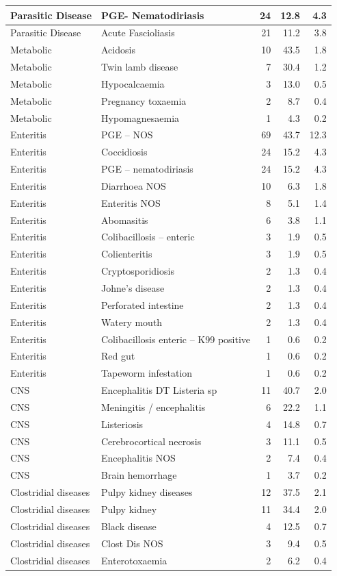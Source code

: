 \documentclass[]{book}
\begin{document}
\begin{table}
\begin{tabular}[t]{l|l|r|r|r}
\hline
Parasitic Disease & PGE- Nematodiriasis & 24 & 12.8 & 4.3\\
\hline
Parasitic Disease & Acute Fascioliasis & 21 & 11.2 & 3.8\\
\hline
Metabolic & Acidosis & 10 & 43.5 & 1.8\\
\hline
Metabolic & Twin lamb disease & 7 & 30.4 & 1.2\\
\hline
Metabolic & Hypocalcaemia & 3 & 13.0 & 0.5\\
\hline
Metabolic & Pregnancy toxaemia & 2 & 8.7 & 0.4\\
\hline
Metabolic & Hypomagnesaemia & 1 & 4.3 & 0.2\\
\hline
Enteritis & PGE – NOS & 69 & 43.7 & 12.3\\
\hline
Enteritis & Coccidiosis & 24 & 15.2 & 4.3\\
\hline
Enteritis & PGE – nematodiriasis & 24 & 15.2 & 4.3\\
\hline
Enteritis & Diarrhoea NOS & 10 & 6.3 & 1.8\\
\hline
Enteritis & Enteritis NOS & 8 & 5.1 & 1.4\\
\hline
Enteritis & Abomasitis & 6 & 3.8 & 1.1\\
\hline
Enteritis & Colibacillosis – enteric & 3 & 1.9 & 0.5\\
\hline
Enteritis & Colienteritis & 3 & 1.9 & 0.5\\
\hline
Enteritis & Cryptosporidiosis & 2 & 1.3 & 0.4\\
\hline
Enteritis & Johne’s disease & 2 & 1.3 & 0.4\\
\hline
Enteritis & Perforated intestine & 2 & 1.3 & 0.4\\
\hline
Enteritis & Watery mouth & 2 & 1.3 & 0.4\\
\hline
Enteritis & Colibacillosis enteric – K99 positive & 1 & 0.6 & 0.2\\
\hline
Enteritis & Red gut & 1 & 0.6 & 0.2\\
\hline
Enteritis & Tapeworm infestation & 1 & 0.6 & 0.2\\
\hline
CNS & Encephalitis DT Listeria sp & 11 & 40.7 & 2.0\\
\hline
CNS & Meningitis / encephalitis & 6 & 22.2 & 1.1\\
\hline
CNS & Listeriosis & 4 & 14.8 & 0.7\\
\hline
CNS & Cerebrocortical necrosis & 3 & 11.1 & 0.5\\
\hline
CNS & Encephalitis NOS & 2 & 7.4 & 0.4\\
\hline
CNS & Brain hemorrhage & 1 & 3.7 & 0.2\\
\hline
Clostridial diseases & Pulpy kidney diseases & 12 & 37.5 & 2.1\\
\hline
Clostridial diseases & Pulpy kidney & 11 & 34.4 & 2.0\\
\hline
Clostridial diseases & Black disease & 4 & 12.5 & 0.7\\
\hline
Clostridial diseases & Clost Dis NOS & 3 & 9.4 & 0.5\\
\hline
Clostridial diseases & Enterotoxaemia & 2 & 6.2 & 0.4\\
\hline
\end{tabular}
\end{table}
\end{document}
